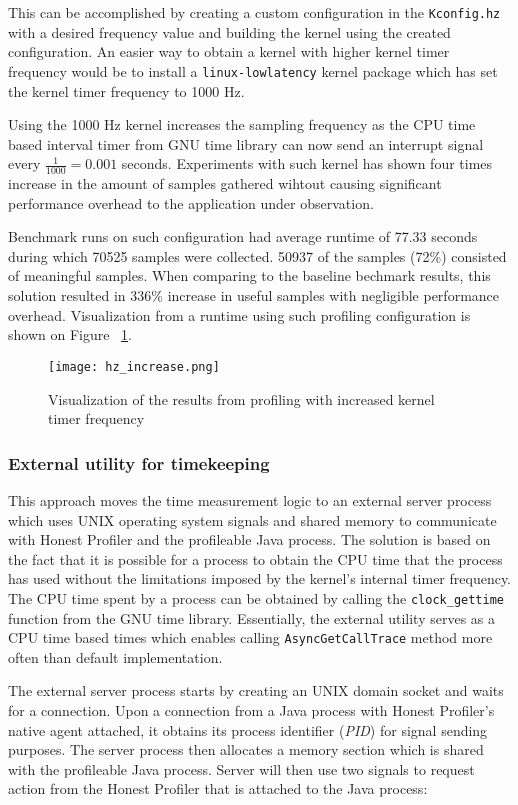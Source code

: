 \documentclass[..thesis.tex]{subfiles}
\begin{document}
This can be accomplished by creating a custom configuration in the \texttt{Kconfig.hz} with a desired frequency value and building the kernel using the created configuration. An easier way to obtain a kernel with higher kernel timer frequency would be to install a \texttt{linux-lowlatency} kernel package which has set the kernel timer frequency to 1000 Hz.

Using the 1000 Hz kernel increases the sampling frequency as the CPU time based interval timer from GNU time library can now send an interrupt signal every $\frac{1}{1000} = 0.001$ seconds. Experiments with such kernel has shown four times increase in the amount of samples gathered wihtout causing significant performance overhead to the application under observation.

Benchmark runs on such configuration had average runtime of 77.33 seconds during which 70525 samples were collected. 50937 of the samples (72\%) consisted of meaningful samples. When comparing to the baseline bechmark results, this solution resulted in 336\% increase in useful samples with negligible performance overhead. Visualization from a runtime using such profiling configuration is shown on Figure ~\ref{fig:hz_increase}.
\begin{figure}[H]
\texttt{[image: hz\_increase.png]}
\caption{Visualization of the results from profiling with increased kernel timer frequency}
\label{fig:hz_increase}
\end{figure}

\subsubsection{External utility for timekeeping}
\label{shared-mem}

This approach moves the time measurement logic to an external server process which uses UNIX operating system signals and shared memory to communicate with Honest Profiler and the profileable Java process. The solution is based on the fact that it is possible for a process to obtain the CPU time that the process has used without the limitations imposed by the kernel's internal timer frequency. The CPU time spent by a process can be obtained by calling the \texttt{clock\_\-gettime} function from the GNU time library. Essentially, the external utility serves as a CPU time based times which enables calling \texttt{Async\-Get\-Call\-Trace} method more often than default implementation.

The external server process starts by creating an UNIX domain socket and waits for a connection. Upon a connection from a Java process with Honest Profiler's native agent attached, it obtains its process identifier (\textit{PID}) for signal sending purposes. The server process then allocates a memory section which is shared with the profileable Java process. Server will then use two signals to request action from the Honest Profiler that is attached to the Java process:
\end{document}
